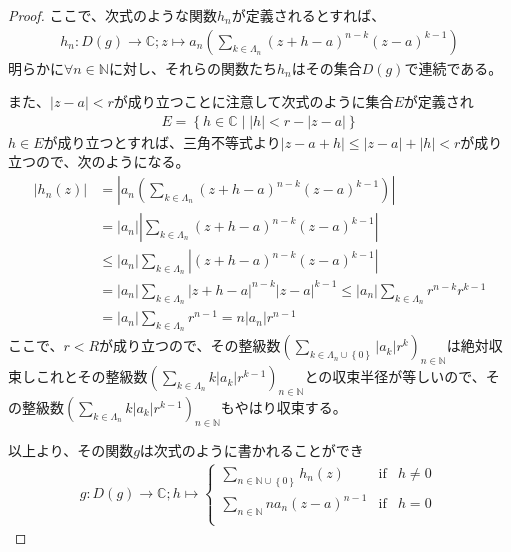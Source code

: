 \documentclass[dvipdfmx]{jsarticle}
\begin{document}
\begin{proof}
ここで、次式のような関数$h_{n}$が定義されるとすれば、
\begin{align*}
h_{n}:D(g) \rightarrow \mathbb{C};z \mapsto a_{n}\left( \sum_{k \in \varLambda_{n}} {(z + h - a)^{n - k}(z - a)^{k - 1}} \right)
\end{align*}
明らかに$\forall n \in \mathbb{N}$に対し、それらの関数たち$h_{n}$はその集合$D(g)$で連続である。\par
また、$|z - a| < r$が成り立つことに注意して次式のように集合$E$が定義され
\begin{align*}
E = \left\{ h \in \mathbb{C} \middle| |h| < r - |z - a| \right\}
\end{align*}
$h \in E$が成り立つとすれば、三角不等式より$|z - a + h| \leq |z - a| + |h| < r$が成り立つので、次のようになる。
\begin{align*}
\left| h_{n}(z) \right| &= \left| a_{n}\left( \sum_{k \in \varLambda_{n}} {(z + h - a)^{n - k}(z - a)^{k - 1}} \right) \right|\\
&= \left| a_{n} \right|\left| \sum_{k \in \varLambda_{n}} {(z + h - a)^{n - k}(z - a)^{k - 1}} \right|\\
&\leq \left| a_{n} \right|\sum_{k \in \varLambda_{n}} \left| (z + h - a)^{n - k}(z - a)^{k - 1} \right|\\
&= \left| a_{n} \right|\sum_{k \in \varLambda_{n}} {|z + h - a|^{n - k}|z - a|^{k - 1}} \leq \left| a_{n} \right|\sum_{k \in \varLambda_{n}} {r^{n - k}r^{k - 1}}\\
&= \left| a_{n} \right|\sum_{k \in \varLambda_{n}} r^{n - 1} = n\left| a_{n} \right|r^{n - 1}
\end{align*}
ここで、$r < R$が成り立つので、その整級数$\left( \sum_{k \in \varLambda_{n} \cup \left\{ 0 \right\}} {\left| a_{k} \right|r^{k}} \right)_{n \in \mathbb{N}}$は絶対収束しこれとその整級数$\left( \sum_{k \in \varLambda_{n}} {k\left| a_{k} \right|r^{k - 1}} \right)_{n \in \mathbb{N}}$との収束半径が等しいので、その整級数$\left( \sum_{k \in \varLambda_{n}} {k\left| a_{k} \right|r^{k - 1}} \right)_{n \in \mathbb{N}}$もやはり収束する。\par
以上より、その関数$g$は次式のように書かれることができ
\begin{align*}
g:D(g) \rightarrow \mathbb{C};h \mapsto \left\{ \begin{matrix}
\sum_{n \in \mathbb{N} \cup \left\{ 0 \right\}} {h_{n}(z)} & \mathrm{if} & h \neq 0 \\
\sum_{n \in \mathbb{N}} {na_{n}(z - a)^{n - 1}} & \mathrm{if} & h = 0 \\
\end{matrix} \right.\ 

\end{align*}
\end{proof}
\end{document}
